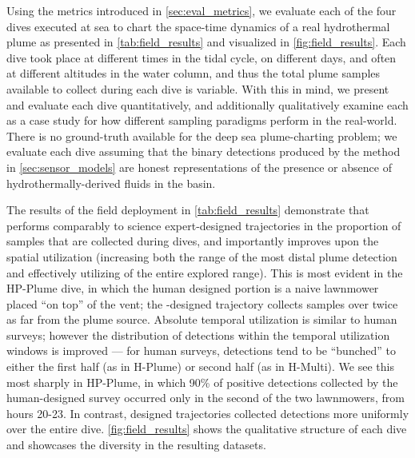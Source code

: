 Using the metrics introduced in \cref{sec:eval_metrics}, we evaluate each of the four dives executed at sea to chart the space-time dynamics of a real hydrothermal plume as presented in \cref{tab:field_results} and visualized in \cref{fig:field_results}. Each dive took place at different times in the tidal cycle, on different days, and often at different altitudes in the water column, and thus the total plume samples available to collect during each dive is variable. With this in mind, we present and evaluate each dive quantitatively, and additionally qualitatively examine each as a case study for how different sampling paradigms perform in the real-world. There is no ground-truth available for the deep sea plume-charting problem; we evaluate each \Sentry dive assuming that the binary detections produced by the method in \cref{sec:sensor_models} are honest representations of the presence or absence of hydrothermally-derived fluids in the basin. 

The results of the field deployment in \cref{tab:field_results} demonstrate that \PHORTEX performs comparably to science expert-designed trajectories in the proportion of samples that are collected during dives, and importantly improves upon the spatial utilization (increasing both the range of the most distal plume detection and effectively utilizing of the entire explored range). This is most evident in the HP-Plume dive, in which the human designed portion is a naive lawnmower placed ``on top'' of the vent; the \PHORTEX-designed trajectory collects samples over twice as far from the plume source. Absolute temporal utilization is similar to human surveys; however the distribution of detections within the temporal utilization windows is improved --- for human surveys, detections tend to be ``bunched'' to either the first half (as in H-Plume) or second half (as in H-Multi). We see this most sharply in HP-Plume, in which 90\% of positive detections collected by the human-designed survey occurred only in the second of the two lawnmowers, from hours 20-23. In contrast, \PHORTEX designed trajectories collected detections more uniformly over the entire dive.  \cref{fig:field_results} shows the qualitative structure of each dive and showcases the diversity in the resulting datasets.

